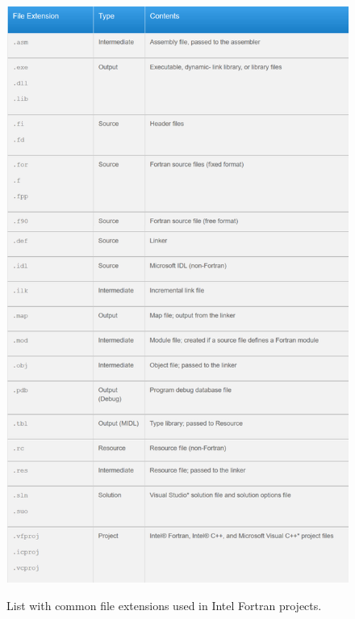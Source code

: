 \begin{enumerate}
    \begin{figure}[h]
        \centering
        \caption{List with common file extensions used in Intel Fortran projects.}
        \includegraphics[width= 0.9 \textwidth]{Figures/Formats}
        \label{fig:Formats}
    \end{figure}




\end{enumerate}
